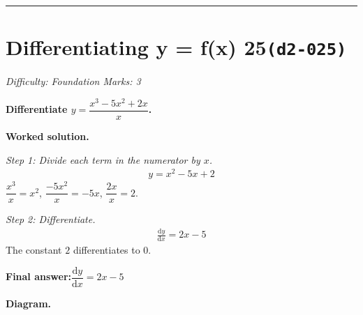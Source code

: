 \documentclass[11pt]{article}
\newcommand{\question}[1]{\par\medskip\noindent\textbf{#1}\par}
\begin{document}
\medskip\hrule

\section*{Differentiating y = f(x) 25\quad\small\texttt{(d2-025)}}
\textit{Difficulty: Foundation \quad\textbar\quad Marks: 3}

\question{Differentiate \( y = \dfrac{x^3 - 5x^2 + 2x}{x} \).}

\textbf{Worked solution.}

\textit{Step 1: Divide each term in the numerator by \( x \).}
\[\begin{gathered}
y = x^2 - 5x + 2
\end{gathered}\]
\( \dfrac{x^3}{x} = x^2 \), \( \dfrac{-5x^2}{x} = -5x \), \( \dfrac{2x}{x} = 2 \).

\textit{Step 2: Differentiate.}
\[\begin{gathered}
\frac{\mathrm{d}y}{\mathrm{d}x} = 2x - 5
\end{gathered}\]
The constant \(2\) differentiates to \(0\).

\begin{answerbox}
\textbf{Final answer:}\quad \(\displaystyle  \dfrac{\mathrm{d}y}{\mathrm{d}x} = 2x - 5 \)
\end{answerbox}
\textbf{Diagram.}
\end{document}
